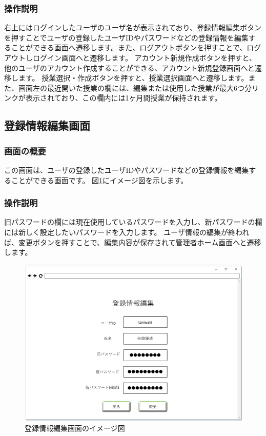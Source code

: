 \subsubsection{操作説明}
右上にはログインしたユーザのユーザ名が表示されており、登録情報編集ボタンを押すことでユーザの登録したユーザIDやパスワードなどの登録情報を編集することができる画面へ遷移します。また、ログアウトボタンを押すことで、ログアウトしログイン画面へと遷移します。
アカウント新規作成ボタンを押すと、他のユーザのアカウント作成することができる、アカウント新規登録画面へと遷移します。
授業選択・作成ボタンを押すと、授業選択画面へと遷移します。また、画面左の最近開いた授業の欄には、編集または使用した授業が最大6つ分リンクが表示されており、この欄内には1ヶ月間授業が保持されます。

\newpage

\subsection{登録情報編集画面}
\subsubsection{画面の概要}
この画面は、ユーザの登録したユーザIDやパスワードなどの登録情報を編集することができる画面です。
図\ref{fig:06}にイメージ図を示します。

\subsubsection{操作説明}
旧パスワードの欄には現在使用しているパスワードを入力し、新パスワードの欄には新しく設定したいパスワードを入力します。
ユーザ情報の編集が終われば、変更ボタンを押すことで、編集内容が保存されて管理者ホーム画面へと遷移します。

\begin{figure}[htbp]
  \begin{center}
    \includegraphics[width=1\linewidth,clip]{./img/06.png}
    \caption{登録情報編集画面のイメージ図}\label{fig:06}
  \end{center}
\end{figure}

